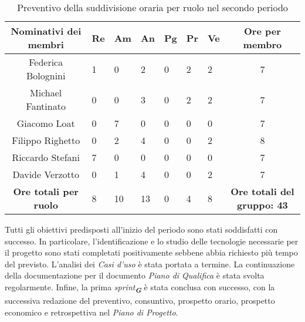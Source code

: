 \begin{table}[h!]
    \centering
    \renewcommand{\arraystretch}{1.5}
    \begin{tabularx}{\textwidth}{|c|X|X|X|X|X|X|c|}\hline
    \rowcolor[HTML]{FFD700} 
    \textbf{Nominativi dei membri} & \textbf{Re} & \textbf{Am} & \textbf{An} & \textbf{Pg} & \textbf{Pr} & \textbf{Ve} & \textbf{Ore per membro} \\ \hline
    Federica Bolognini  & 1 & 0 & 2 & 0 & 2 & 2 & 7 \\ \hline
    Michael Fantinato   & 0 & 0 & 3 & 0 & 2 & 2 & 7 \\ \hline
    Giacomo Loat        & 0 & 7 & 0 & 0 & 0 & 0 & 7 \\ \hline
    Filippo Righetto    & 0 & 2 & 4 & 0 & 0 & 2 & 8 \\ \hline
    Riccardo Stefani    & 7 & 0 & 0 & 0 & 0 & 0 & 7 \\ \hline
    Davide Verzotto     & 0 & 1 & 4 & 0 & 0 & 2 & 7 \\ \hline
    \rowcolor[HTML]{FFD700} 
    \textbf{Ore totali per ruolo} & 8 & 10 & 13 & 0 & 4 & 8 & \textbf{Ore totali del gruppo: 43} \\ \hline
    \end{tabularx}
    \caption{Preventivo della suddivisione oraria per ruolo nel secondo periodo}
\end{table}

Tutti gli obiettivi predisposti all'inizio del periodo sono stati soddisfatti con successo. In particolare, l'identificazione e lo studio delle tecnologie necessarie per il progetto sono stati completati positivamente sebbene abbia richiesto più tempo del previsto. L'analisi dei \textit{Casi d'uso} è stata portata a termine. La continuazione della documentazione per il documento \textit{Piano di Qualifica} è stata svolta regolarmente. Infine, la prima {\emph{sprint}}\textsubscript{\textit{\textbf{G}}} è stata conclusa con successo, con la successiva redazione del preventivo, consuntivo, prospetto orario, prospetto economico e retrospettiva nel \textit{Piano di Progetto}.

\newpage

